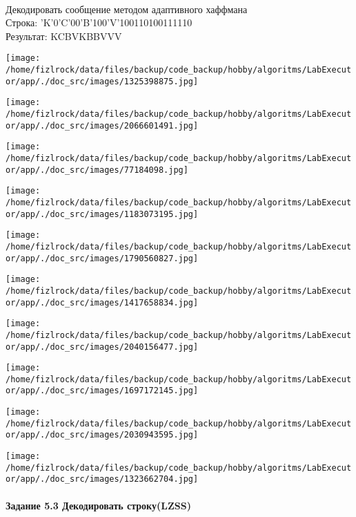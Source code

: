 \documentclass[a4paper, 12pt]{article}
\begin{document}
\\ 

Декодировать сообщение методом адаптивного хаффмана \\
Строка: 
'K'0'C'00'B'100'V'100110100111110\\
Результат: KCBVKBBVVV

\texttt{[image: /home/fizlrock/data/files/backup/code\_backup/hobby/algoritms/LabExecutor/app/./doc\_src/images/1325398875.jpg]}

\texttt{[image: /home/fizlrock/data/files/backup/code\_backup/hobby/algoritms/LabExecutor/app/./doc\_src/images/2066601491.jpg]}

\texttt{[image: /home/fizlrock/data/files/backup/code\_backup/hobby/algoritms/LabExecutor/app/./doc\_src/images/77184098.jpg]}

\texttt{[image: /home/fizlrock/data/files/backup/code\_backup/hobby/algoritms/LabExecutor/app/./doc\_src/images/1183073195.jpg]}

\texttt{[image: /home/fizlrock/data/files/backup/code\_backup/hobby/algoritms/LabExecutor/app/./doc\_src/images/1790560827.jpg]}

\texttt{[image: /home/fizlrock/data/files/backup/code\_backup/hobby/algoritms/LabExecutor/app/./doc\_src/images/1417658834.jpg]}

\texttt{[image: /home/fizlrock/data/files/backup/code\_backup/hobby/algoritms/LabExecutor/app/./doc\_src/images/2040156477.jpg]}

\texttt{[image: /home/fizlrock/data/files/backup/code\_backup/hobby/algoritms/LabExecutor/app/./doc\_src/images/1697172145.jpg]}

\texttt{[image: /home/fizlrock/data/files/backup/code\_backup/hobby/algoritms/LabExecutor/app/./doc\_src/images/2030943595.jpg]}

\texttt{[image: /home/fizlrock/data/files/backup/code\_backup/hobby/algoritms/LabExecutor/app/./doc\_src/images/1323662704.jpg]}
\pagebreak
\paragraph{Задание 5.3 Декодировать строку(LZSS)\\}
\end{document}
